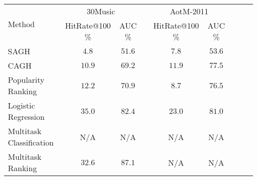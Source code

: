 \begin{tabular}{l*{4}{c}*{4}{c}}
\toprule
\multirow{2}{*}{Method}     & \multicolumn{2}{c}{30Music} && \multicolumn{2}{c}{AotM-2011} \\ \cmidrule{2-3} \cmidrule{5-6}
                            & HitRate@100 \% & AUC \% && HitRate@100 \% & AUC \% \\
\midrule
SAGH                        &          $4.8$ & $51.6$ &&          $7.8$ & $53.6$ \\
CAGH                        &         $10.9$ & $69.2$ &&         $11.9$ & $77.5$ \\
Popularity Ranking          &         $12.2$ & $70.9$ &&          $8.7$ & $76.5$ \\
Logistic Regression         &         $35.0$ & $82.4$ &&         $23.0$ & $81.0$ \\
Multitask Classification    &            N/A &    N/A &&            N/A &    N/A \\
Multitask Ranking           &         $32.6$ & $87.1$ &&            N/A &    N/A \\
\bottomrule
\end{tabular}

